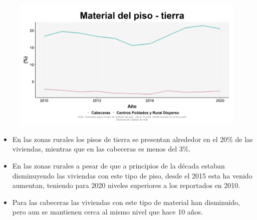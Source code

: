     \begin{figure}[H]
        \caption[Viviendas con piso de tierra por zonas ]{\label{piso_tierra_zonas} }
        \begin{center}
        \includegraphics[width=\textwidth,keepaspectratio]{img/var_180_trend.png}
        \end{center}
    \end{figure}
            \begin{itemize}
                    \item En las zonas rurales los pisos de tierra se presentan alrededor en el 20\% de las viviendas, mientras que en las cabeceras es menos del 3\%.
                    \item En las zonas rurales a pesar de que a principios de la década estaban disminuyendo las viviendas con este tipo de piso, desde el 2015 esta ha venido aumentan, teniendo para 2020 niveles superiores a los reportados en 2010.
                    \item Para las cabeceras las viviendas con este tipo de material han disminuido, pero aun se mantienen cerca al mismo nivel que hace 10 años.
                    \end{itemize}

